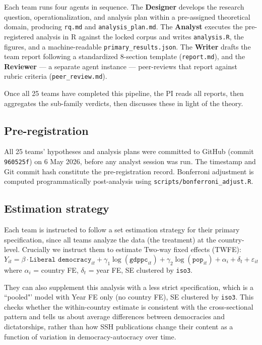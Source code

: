 \documentclass[12pt,a4paper]{article}
\begin{document}
Each team runs four agents in sequence. The \textbf{Designer} develops the
research question, operationalization, and analysis plan within a
pre-assigned theoretical domain, producing \texttt{rq.md} and
\texttt{analysis\_plan.md}. The \textbf{Analyst} executes the
pre-registered analysis in R against the locked corpus and writes
\texttt{analysis.R}, the figures, and a machine-readable
\texttt{primary\_results.json}. The \textbf{Writer} drafts the team report
following a standardized 8-section template
(\texttt{report.md}), and the \textbf{Reviewer} --- a separate agent
instance --- peer-reviews that report against rubric criteria
(\texttt{peer\_review.md}).

Once all 25 teams have completed this pipeline, the PI reads all reports, then aggregates the sub-family verdicts, then discusses these in light of the theory.

\subsection{Pre-registration}

All 25 teams' hypotheses and analysis plans were committed to GitHub
(commit \texttt{960525f}) on 6 May 2026, before any analyst session was run.
The timestamp and Git commit hash constitute the pre-registration record.
Bonferroni adjustment is computed programmatically post-analysis using
\texttt{scripts/bonferroni\_adjust.R}.

\subsection{Estimation strategy}
Each team is instructed to follow a set estimation strategy for their primary specification, since all teams analyze the data (the treatment) at the country-level. Crucially we instruct them to estimate Two-way fixed effects (TWFE):
\begin{equation}
  Y_{it} = \beta \cdot \texttt{Liberal democracy}_{it}
           + \gamma_1 \log(\texttt{gdppc}_{it})
           + \gamma_2 \log(\texttt{pop}_{it})
           + \alpha_i + \delta_t + \varepsilon_{it}
\end{equation}
where $\alpha_i$ = country FE, $\delta_t$ = year FE, SE clustered by \texttt{iso3}.

They can also supplement this analysis with a less strict specification, which is a ``pooled"' model with 
Year FE only (no country FE), SE clustered by \texttt{iso3}. This checks whether
the within-country estimate is consistent with the cross-sectional pattern and tells us about average differences between democracies and dictatorships, rather than how SSH publications change their content as a function of variation in democracy-autocracy over time. 
\end{document}
